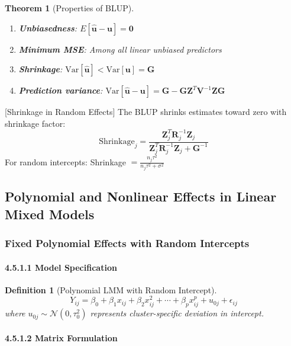 \documentclass{article}
\newtheorem{definition}{Definition}
\newtheorem{theorem}{Theorem}
\begin{document}
\begin{theorem}[Properties of BLUP]
\begin{enumerate}
    \item \textbf{Unbiasedness}: $E[\hat{\mathbf{u}} - \mathbf{u}] = \mathbf{0}$
    \item \textbf{Minimum MSE}: Among all linear unbiased predictors
    \item \textbf{Shrinkage}: $\text{Var}[\hat{\mathbf{u}}] < \text{Var}[\mathbf{u}] = \mathbf{G}$
    \item \textbf{Prediction variance}: $\text{Var}[\hat{\mathbf{u}} - \mathbf{u}] = \mathbf{G} - \mathbf{GZ}^T\mathbf{V}^{-1}\mathbf{ZG}$
\end{enumerate}
\end{theorem}

[Shrinkage in Random Effects]
The BLUP shrinks estimates toward zero with shrinkage factor:
\begin{equation}
\text{Shrinkage}_j = \frac{\mathbf{Z}_j^T\mathbf{R}_j^{-1}\mathbf{Z}_j}{\mathbf{Z}_j^T\mathbf{R}_j^{-1}\mathbf{Z}_j + \mathbf{G}^{-1}}
\end{equation}
For random intercepts: Shrinkage $= \frac{n_j\tau^2}{n_j\tau^2 + \sigma^2}$


\subsection{Polynomial and Nonlinear Effects in Linear Mixed Models}

\subsubsection{Fixed Polynomial Effects with Random Intercepts}

\paragraph{4.5.1.1 Model Specification}

\begin{definition}[Polynomial LMM with Random Intercept]
\begin{equation}
Y_{ij} = \beta_0 + \beta_1 x_{ij} + \beta_2 x_{ij}^2 + \cdots + \beta_p x_{ij}^p + u_{0j} + \epsilon_{ij}
\end{equation}
where $u_{0j} \sim \mathcal{N}(0, \tau_0^2)$ represents cluster-specific deviation in intercept.
\end{definition}

\paragraph{4.5.1.2 Matrix Formulation}
\end{document}
